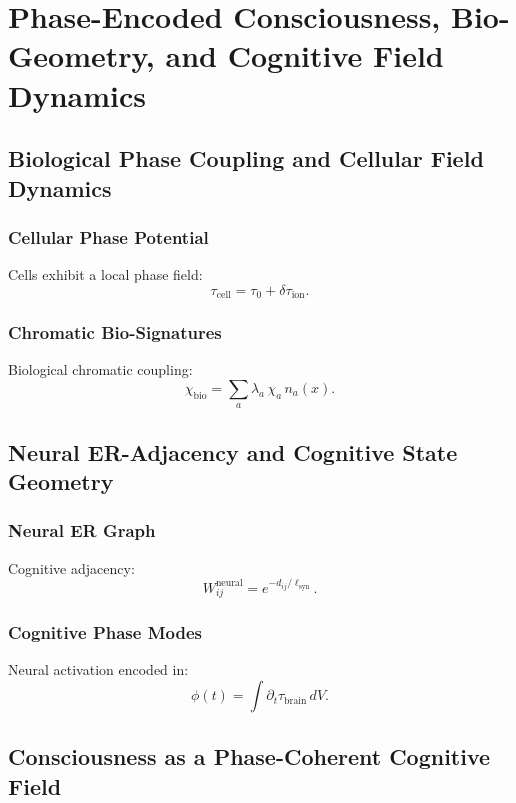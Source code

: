 

\part{Phase-Encoded Consciousness, Bio-Geometry, and Cognitive Field Dynamics}

\chapter{Biological Phase Coupling and Cellular Field Dynamics}

\section{Cellular Phase Potential}
Cells exhibit a local phase field:
\[
\tau_{\mathrm{cell}} = \tau_0 + \delta\tau_{\mathrm{ion}}.
\]

\section{Chromatic Bio-Signatures}
Biological chromatic coupling:
\[
\chi_{\mathrm{bio}} = \sum_a \lambda_a\, \chi_a\, n_a(x).
\]

\chapter{Neural ER-Adjacency and Cognitive State Geometry}

\section{Neural ER Graph}
Cognitive adjacency:
\[
W_{ij}^{\mathrm{neural}} = e^{-d_{ij}/\ell_{\mathrm{syn}}}.
\]

\section{Cognitive Phase Modes}
Neural activation encoded in:
\[
\phi(t) = \int \partial_t\tau_{\mathrm{brain}}\, dV.
\]

\chapter{Consciousness as a Phase-Coherent Cognitive Field}

